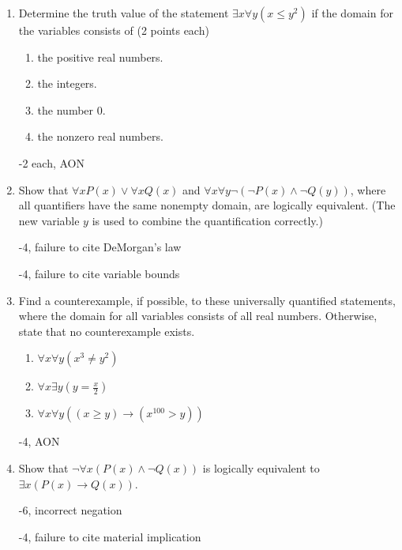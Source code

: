 \begin{enumerate}
    \begin{rubric}
    -2 each, AON
    \end{rubric}
    
    \item{Determine the truth value of the statement $\exists x \forall y (x \leq y^{2})$ if the domain for the variables consists of \hfill \color{blue}(2 points each)}\
    \begin{enumerate}
    \item the positive real numbers.
    \item the integers.
    \item the number 0.
    \item the nonzero real numbers.
    \end{enumerate}
    
    \begin{rubric}
    -2 each, AON
    \end{rubric}
    
    \item{Show that $\forall x P(x) \lor \forall x Q(x)$ and $\forall x \forall y \neg(\neg P(x) \land \neg Q(y))$, where all quantifiers have the same nonempty domain, are logically equivalent. (The new variable $y$ is used to combine the quantification correctly.)} 
    
    \begin{rubric}
        -4, failure to cite DeMorgan's law
        
        -4, failure to cite variable bounds
    \end{rubric}
    
    \item{ Find a counterexample, if possible, to these universally quantified statements, where the domain for all variables consists of all real numbers. Otherwise, state that no counterexample exists. } 
    \begin{enumerate}
        \item $\forall x \forall y (x^3 \neq y^2)$
        \item $\forall x \exists y (y = \frac{x}{2})$
        \item $\forall x \forall y ((x \geq y) \rightarrow (x^{100} > y))$
    \end{enumerate}
    
    \begin{rubric}
        -4, AON
    \end{rubric}
    
    \item{Show that $\neg \forall x(P(x) \land \neg Q(x))$ is logically equivalent to $\exists x (P(x) \rightarrow Q(x))$}. 
    \begin{rubric}
    -6, incorrect negation
    
    -4, failure to cite material implication
    \end{rubric}
    
    
\end{enumerate}